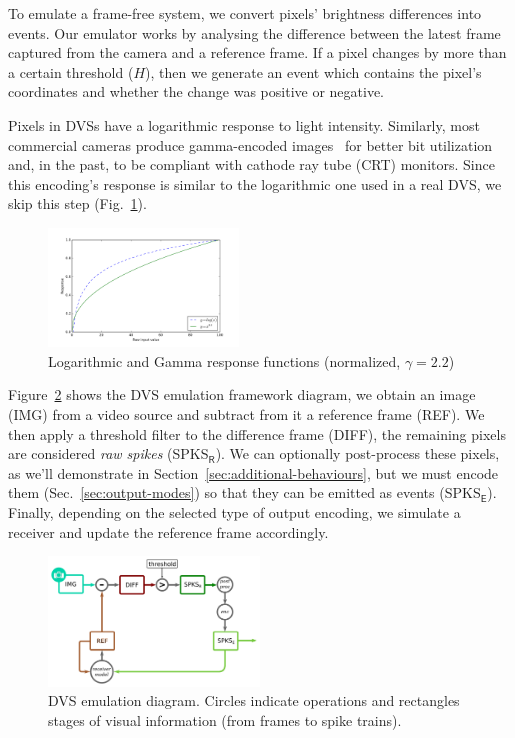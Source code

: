 \documentclass[conference]{IEEEtran}
\begin{document}
To emulate a frame-free system, we convert pixels' brightness differences into events. Our emulator works by analysing the difference between the latest frame captured from the camera and a reference frame. If a pixel changes by more than a certain threshold ($H$), then we generate an event which contains the pixel's coordinates and whether the change was positive or negative. 

Pixels in DVSs have a logarithmic response to light intensity. Similarly, most commercial cameras produce gamma-encoded images~\cite{PoyntonDigitalVideo} for better bit utilization and, in the past, to be compliant with cathode ray tube (CRT) monitors. Since this encoding's response is similar to the logarithmic one used in a real DVS, we skip this step (Fig.~\ref{fig:gamma_coding}).
\begin{figure}[htb]
  \centering
  \includegraphics[width=0.45\textwidth]{log_vs_gamma_response}
  \caption{Logarithmic and Gamma response functions (normalized, $\gamma = 2.2$)}
  \label{fig:gamma_coding}
\end{figure}

Figure~\ref{fig:dvs_emu} shows the DVS emulation framework diagram, we obtain an image (\textsf{IMG}) from a video source and subtract from it a reference frame (\textsf{REF}). We then apply a threshold filter to the difference frame (\textsf{DIFF}), the remaining pixels are considered \textit{raw spikes} (\textsf{SPKS}$\mathsf{_R}$). We can optionally post-process these pixels, as we'll demonstrate in Section~\ref{sec:additional-behaviours}, but we must encode them (Sec.~\ref{sec:output-modes}) so that they can be emitted as events (\textsf{SPKS}$\mathsf{_E}$). Finally, depending on the selected type of output encoding, we simulate a receiver and update the reference frame accordingly. 

\begin{figure}[htb]
  \centering
  \includegraphics[width=0.5\textwidth]{dvs_emu}
  \caption{DVS emulation diagram. Circles indicate operations and rectangles stages of visual information (from frames to spike trains).}
  \label{fig:dvs_emu}
\end{figure}
\end{document}
